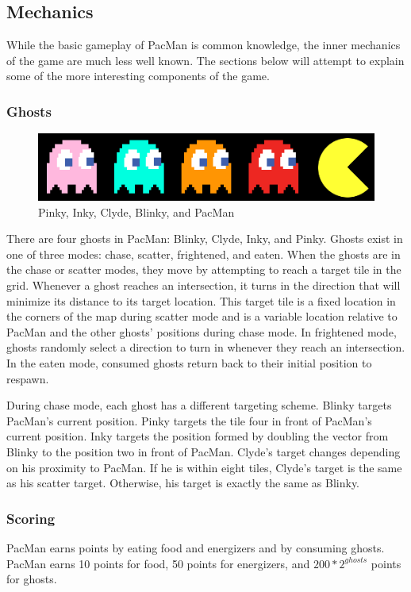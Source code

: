 \documentclass{article}
\begin{document}
\subsection{Mechanics}
While the basic gameplay of PacMan is common knowledge, the inner mechanics of
the game are much less well known. The sections below will attempt to explain
some of the more interesting components of the game.

\subsubsection{Ghosts}
\begin{figure}[h]
	\centering
	\includegraphics[width=0.75\linewidth]{actors}
	\caption{Pinky, Inky, Clyde, Blinky, and PacMan \label{f:actors}}
\end{figure}

There are four ghosts in PacMan: Blinky, Clyde, Inky, and Pinky. Ghosts exist in
one of three modes: chase, scatter, frightened, and eaten. When the ghosts are
in the chase or scatter modes, they move by attempting to reach a target tile in
the grid. Whenever a ghost reaches an intersection, it turns in the direction
that will minimize its distance to its target location. This target tile is a
fixed location in the corners of the map during scatter mode and is a variable
location relative to PacMan and the other ghosts' positions during chase mode.
In frightened mode, ghosts randomly select a direction to turn in whenever they
reach an intersection. In the eaten mode, consumed ghosts return back to their
initial position to respawn.

During chase mode, each ghost has a different targeting scheme. Blinky targets
PacMan's current position. Pinky targets the tile four in front of PacMan's
current position. Inky targets the position formed by doubling the vector from
Blinky to the position two in front of PacMan. Clyde's target changes depending
on his proximity to PacMan. If he is within eight tiles, Clyde's target is the
same as his scatter target. Otherwise, his target is exactly the same as Blinky.

\subsubsection{Scoring}
PacMan earns points by eating food and energizers and by consuming ghosts.
PacMan earns 10 points for food, 50 points for energizers, and $200 *
2^{ghosts}$ points for ghosts.
\end{document}
